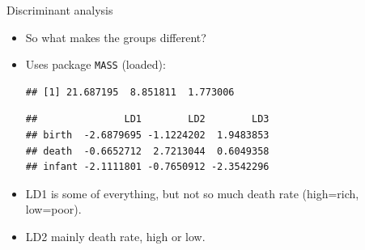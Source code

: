 \begin{frame}[fragile]{Discriminant analysis}
  
  \begin{itemize}
  \item So what makes the groups different?
  \item Uses package \texttt{MASS} (loaded):
    
  
\begin{knitrout}
\color{fgcolor}\begin{kframe}
\begin{alltt}
\hlkwb{=}\hlopt{~}\hlopt{+}\hlopt{+}
\hlopt{$}
\end{alltt}
\begin{verbatim}
## [1] 21.687195  8.851811  1.773006
\end{verbatim}
\begin{alltt}
\hlopt{$}
\end{alltt}
\begin{verbatim}
##               LD1        LD2        LD3
## birth  -2.6879695 -1.1224202  1.9483853
## death  -0.6652712  2.7213044  0.6049358
## infant -2.1111801 -0.7650912 -2.3542296
\end{verbatim}
\end{kframe}
\end{knitrout}
\item LD1 is some of everything, but not so much death rate
  (high=rich, low=poor).
\item LD2 mainly death rate, high or low.
    
  \end{itemize}
  
\end{frame}

